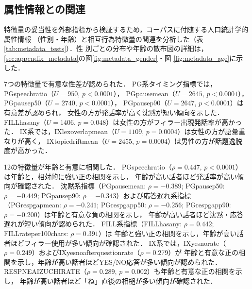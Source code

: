 \documentclass[dvipdfmx,11pt,a4paper]{bxjsarticle}
\renewcommand{\_}{\paperorigunderscore\allowbreak}%
\begin{document}
\subsection{属性情報との関連}
\label{sec:result_metadata}

特徴量の妥当性を外部指標から検証するため，コーパスに付随する人口統計学的属性情報
（性別・年齢）と相互行為特徴量の関連を分析した（表\ref{tab:metadata_tests}）．性
別ごとの分布や年齢の散布図の詳細は，\ref{sec:appendix_metadata}の図\ref{fig:metadata_gender}・図
\ref{fig:metadata_age}に示した．


\begin{table}[htbp]
\centering
\caption{相互行為特徴量とコーパス基本情報（性別・年齢）の関連．* $p < 0.05$}
\label{tab:metadata_tests}

\end{table}


7つの特徴量で有意な性差が認められた．
PG系タイミング指標では，PG\_speech\_ratio（$U = 950$, $p < 0.0001$），
PG\_pause\_mean（$U = 2645$, $p < 0.0001$），
PG\_pause\_p50（$U = 2740$, $p < 0.0001$），
PG\_pause\_p90（$U = 2647$, $p < 0.0001$）は有意差が認められ，
女性の方が発話率が高く沈黙が短い傾向を示した．
FILL\_has\_any（$U = 1406$, $p = 0.048$）は女性の方がフィラー出現発話率が高かった．
IX系では，IX\_lex\_overlap\_mean（$U = 1109$, $p = 0.0004$）は女性の方が語彙重なりが高く，
IX\_topic\_drift\_mean（$U = 2455$, $p = 0.0004$）は男性の方が話題逸脱度が高かった．

12の特徴量が年齢と有意に相関した．
PG\_speech\_ratio（$\rho = 0.447$, $p < 0.0001$）は年齢と，相対的に強い正の相関を示し，
年齢が高い話者ほど発話率が高い傾向が確認された．
沈黙系指標（PG\_pause\_mean: $\rho = -0.389$; PG\_pause\_p50: $\rho = -0.449$;
PG\_pause\_p90: $\rho = -0.343$）および応答遅れ系指標
（PG\_resp\_gap\_mean: $\rho = -0.241$; PG\_resp\_gap\_p50: $\rho = -0.256$;
PG\_resp\_gap\_p90: $\rho = -0.200$）は年齢と有意な負の相関を示し，
年齢が高い話者ほど沈黙・応答遅れが短い傾向が認められた．
FILL系指標（FILL\_has\_any: $\rho = 0.442$; FILL\_rate\_per\_100chars: $\rho = 0.391$）は
年齢と強い正の相関を示し，年齢が高い話者ほどフィラー使用が多い傾向が確認された．
IX系では，IX\_yesno\_rate（$\rho = 0.249$）およびIX\_yesno\_after\_question\_rate（$\rho = 0.279$）が
年齢と有意な正の相関を示し，年齢が高い話者ほどYES/NO応答が多い傾向が認められた．
RESP\_NE\_AIZUCHI\_RATE（$\rho = 0.289$, $p = 0.002$）も年齢と有意な正の相関を示し，
年齢が高い話者ほど「ね」直後の相槌が多い傾向が確認された．
\end{document}
